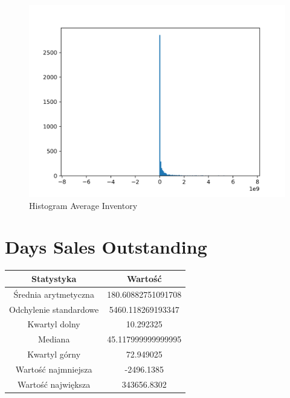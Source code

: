 \documentclass{article}
\begin{document}
\begin{figure}[h!]
    \includegraphics[width=\linewidth]{variables/Average Inventory.png}
    \caption{Histogram Average Inventory }
\end{figure}\section{ Days Sales Outstanding }

\begin{center}
    \begin{tabular}{|c | c|} 
    \hline
    Statystyka & Wartość \\
    \hline\hline
    Średnia arytmetyczna & 180.60882751091708 \\ 
    \hline
    Odchylenie standardowe & 5460.118269193347 \\
    \hline
    Kwartyl dolny & 10.292325 \\
    \hline
    Mediana & 45.117999999999995 \\
    \hline
    Kwartyl górny & 72.949025 \\
    \hline
    Wartość najmniejsza & -2496.1385 \\
    \hline
    Wartość największa & 343656.8302 \\
    \hline
   \end{tabular}
\end{center}
\end{document}
